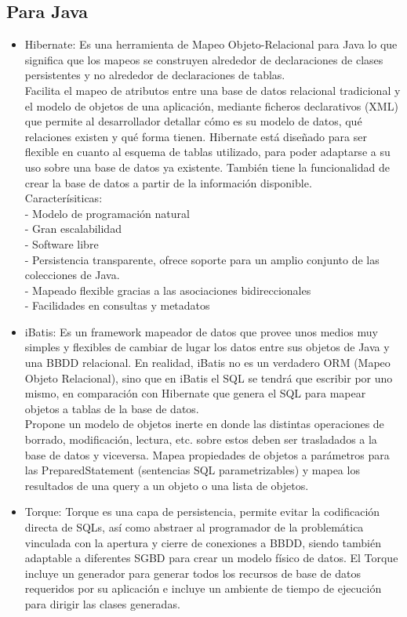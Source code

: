 \documentclass[%
 reprint,
 amsmath,amssymb,
 aps,
]{revtex4-1}
\begin{document}
\subsection{Para Java}
\begin{itemize}
	\item Hibernate: Es una herramienta de Mapeo Objeto-Relacional para Java lo que significa que los mapeos se construyen alrededor de declaraciones de clases persistentes y no alrededor de declaraciones de tablas.\cite{Community}\\
Facilita el mapeo de atributos entre una base de datos relacional tradicional y el modelo de objetos de una aplicación, mediante ficheros declarativos (XML) que permite al desarrollador detallar cómo es su modelo de datos, qué relaciones existen y qué forma tienen. Hibernate está diseñado para ser flexible en cuanto al esquema de tablas utilizado, para poder adaptarse a su uso sobre una base de datos ya existente. También tiene la funcionalidad de crear la base de datos a partir de la información disponible.\cite{JuntaAndalucia}\\
Caracterísiticas:\\
- Modelo de programación natural\\
- Gran escalabilidad\\
- Software libre\\
- Persistencia transparente, ofrece soporte para un amplio conjunto de las colecciones de Java.\\
- Mapeado flexible gracias a las asociaciones bidireccionales\\
- Facilidades en consultas y metadatos
	\item iBatis: Es un framework mapeador de datos que provee unos medios muy simples y flexibles de cambiar de lugar los datos entre sus objetos de Java y una BBDD relacional. En realidad, iBatis no es un verdadero ORM (Mapeo Objeto Relacional), sino que en iBatis el SQL se tendrá que escribir por uno mismo, en comparación con Hibernate que genera el SQL para mapear objetos a tablas de la base de datos. \cite{Batis}\\
Propone un modelo de objetos inerte en donde las distintas operaciones de borrado, modificación, lectura, etc. sobre estos deben ser trasladados a la base de datos y viceversa. Mapea propiedades de objetos a parámetros para las PreparedStatement (sentencias SQL parametrizables) y mapea los resultados de una query a un objeto o una lista de objetos.
	\item Torque: Torque es una capa de persistencia, permite evitar la codificación directa de SQLs, así como abstraer al programador de la problemática vinculada con la apertura y cierre de conexiones a BBDD, siendo también adaptable a diferentes SGBD para crear un modelo físico de datos. El Torque incluye un generador para generar todos los recursos de base de datos requeridos por su aplicación e incluye un ambiente de tiempo de ejecución para dirigir las clases generadas. \cite{Torque}\\
\end{itemize}
\end{document}
